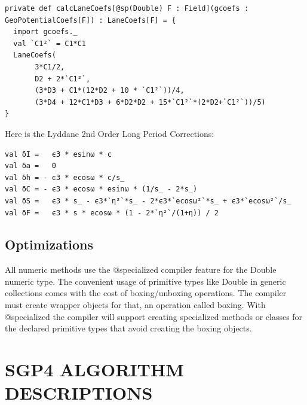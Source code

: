 \documentclass{article}
\begin{document}
\begin{lstlisting}[style=myScalastyle]
private def calcLaneCoefs[@sp(Double) F : Field](gcoefs : GeoPotentialCoefs[F]) : LaneCoefs[F] = {
  import gcoefs._
  val `C1²` = C1*C1
  LaneCoefs(
       3*C1/2,
       D2 + 2*`C1²`,
       (3*D3 + C1*(12*D2 + 10 * `C1²`))/4,
       (3*D4 + 12*C1*D3 + 6*D2*D2 + 15*`C1²`*(2*D2+`C1²`))/5)
}
\end{lstlisting}
Here is the Lyddane 2nd Order Long Period Corrections:
\begin{lstlisting}[style=myScalastyle]
val δI =   ϵ3 * esinω * c
val δa =   0
val δh = - ϵ3 * ecosω * c/s_
val δC = - ϵ3 * ecosω * esinω * (1/s_ - 2*s_)
val δS =   ϵ3 * s_ - ϵ3*`η²`*s_ - 2*ϵ3*`ecosω²`*s_ + ϵ3*`ecosω²`/s_
val δF =   ϵ3 * s * ecosω * (1 - 2*`η²`/(1+η)) / 2
\end{lstlisting}

\subsection{Optimizations}
\label{sec:optimizations}

All numeric methods use the @specialized compiler feature for the Double numeric type.
The convenient usage of primitive types like Double in generic collections comes with
the cost of boxing/unboxing operations. The compiler
must create wrapper objects for that, an operation called boxing. With @specialized
the compiler will support creating specialized methods or classes for the
declared primitive types that avoid creating the boxing objects.




\section{SGP4 ALGORITHM DESCRIPTIONS}
\label{sec:algorithms}


\end{document}
